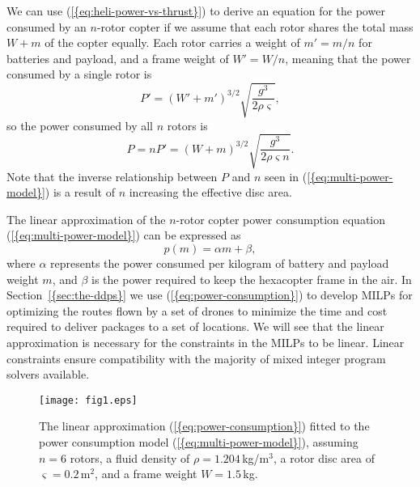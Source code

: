 \documentclass[journal]{IEEEtran}
\begin{document}
We can use {(\ref{{eq:heli-power-vs-thrust}})} to derive an equation for the power consumed by an ${\ensuremath{n}}$-rotor copter if we assume that each rotor shares the total mass ${\ensuremath{W}}+{\ensuremath{m}}$ of the copter equally. Each rotor carries a weight of ${\ensuremath{{\ensuremath{m}}'}} = {\ensuremath{m}} / {\ensuremath{n}}$ for batteries and payload, and a frame weight of ${\ensuremath{W}}' = {\ensuremath{W}} / {\ensuremath{n}}$, meaning that the power consumed by a single rotor is 
\begin{equation*}
{\ensuremath{{\ensuremath{P}}'}} = \left({\ensuremath{W}}' + {\ensuremath{{\ensuremath{m}}'}} \right)^{3/2} \sqrt{\frac{{\ensuremath{g}}^3}{2 {\ensuremath{\rho}} {\ensuremath{\varsigma}}}},
\end{equation*}
so the power consumed by all ${\ensuremath{n}}$ rotors is
\begin{equation}
\label{eq:multi-power-model}
{\ensuremath{P}} = {\ensuremath{n}} {\ensuremath{{\ensuremath{P}}'}} = \left({\ensuremath{W}} + {\ensuremath{m}} \right) ^ {3/2} \sqrt{\frac{{\ensuremath{g}}^3}{2 {\ensuremath{\rho}} {\ensuremath{\varsigma}} {\ensuremath{n}}}}.
\end{equation}
Note that the inverse relationship between ${\ensuremath{P}}$ and ${\ensuremath{n}}$ seen in {(\ref{{eq:multi-power-model}})} is a result of ${\ensuremath{n}}$ increasing the effective disc area.

The linear approximation of the ${\ensuremath{n}}$-rotor copter power consumption equation {(\ref{{eq:multi-power-model}})} can be expressed as
\begin{equation}
\label{eq:power-consumption}
{\ensuremath{p({\ensuremath{m}})}} = {\ensuremath{\alpha}} {\ensuremath{m}} + {\ensuremath{\beta}},
\end{equation}
where ${\ensuremath{\alpha}}$ represents the power consumed per kilogram of battery and payload weight ${\ensuremath{m}}$, and ${\ensuremath{\beta}}$ is the power required to keep the hexacopter frame in the air. In {Section~\ref{{sec:the-ddps}}} we use {(\ref{{eq:power-consumption}})} to develop MILPs for optimizing the routes flown by a set of drones to minimize the time and cost required to deliver packages to a set of locations. We will see that the linear approximation is necessary for the constraints in the MILPs to be linear. Linear constraints ensure compatibility with the majority of mixed integer program solvers available.

\begin{figure}[t!]
  \centering
  \texttt{[image: fig1.eps]}
  \caption{The linear approximation {(\ref{{eq:power-consumption}})} fitted to the power consumption model {(\ref{{eq:multi-power-model}})}, assuming ${\ensuremath{n}}=6$ rotors, a fluid density of ${\ensuremath{\rho}}=1.204$\,kg/m$^3$, a rotor disc area of ${\ensuremath{\varsigma}}=0.2$\,m$^2$, and a frame weight ${\ensuremath{W}}=1.5$\,kg.}
  \label{fig:power-consumption}
\end{figure}
\end{document}
